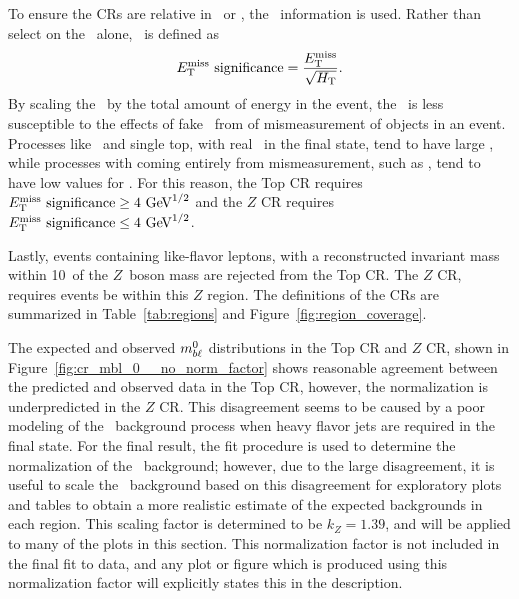 To ensure the CRs are relative in \TTBAR\ or \ZGAMMAJETS, the \MET\ information
is used.
Rather than select on the \MET\ alone, \METSIG\ is defined as
\begin{equation}
  E_{\mathrm{T}}^{\mathrm{miss}}~\text{significance} = \frac{E_{\mathrm{T}}^{\mathrm{miss}}}{\sqrt{H_{\mathrm{T}}}}.
\end{equation}
By scaling the \MET\ by the total amount of energy in the event, the
\METSIG\ is less susceptible to the effects of fake \MET\ from of mismeasurement
of objects in an event.
Processes like \TTBAR\ and single top, with real \MET\ in the final state, tend
to have large \METSIG, while processes with \MET coming entirely from
mismeasurement, such as \ZGAMMAJETS, tend to have low values for \METSIG.
For this reason, the Top CR requires $\METSIG \geq 4 \GeV^{1/2}$
and the $Z$ CR requires $\METSIG \leq 4 \GeV^{1/2}$.

Lastly, events containing like-flavor leptons, with a reconstructed invariant
mass within 10~\GeV of the $Z$~boson mass are rejected from the Top CR.
The $Z$ CR, requires events be within this $Z$ region.
The definitions of the CRs are summarized in Table~\ref{tab:regions} and
Figure~\ref{fig:region_coverage}.

The expected and observed $m_{b\ell}^{0}$ distributions in the Top CR and $Z$ CR,
shown in Figure~\ref{fig:cr_mbl_0__no_norm_factor} shows reasonable agreement
between the predicted and observed data in the Top CR, however, the
normalization is underpredicted in the $Z$ CR.
This disagreement seems to be caused by a poor modeling of the
\ZGAMMAJETS\ background process when heavy flavor jets are required in the
final state.
For the final result, the fit procedure is used to determine the normalization
of the \ZGAMMAJETS\ background; however, due to the large disagreement, it is
useful to scale the \ZGAMMAJETS\ background based on this disagreement for
exploratory plots and tables to obtain a more realistic estimate of the expected
backgrounds in each region.
This scaling factor is determined to be $k_Z = 1.39$, and will be applied to
many of the plots in this section.
This normalization factor is not included in the final fit to data, and any plot
or figure which is produced using this normalization factor will explicitly
states this in the description.

